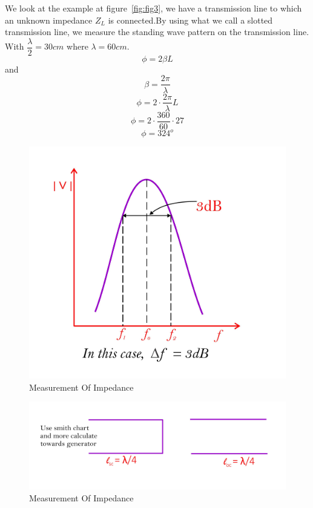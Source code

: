 \begin{example}
We look at the example at figure~\ref{fig:fig3}, we have a transmission line to which an unknown impedance $Z_L$ is connected.By using what we call a slotted transmission line, we measure the standing wave pattern on the transmission line. With $\dfrac{\lambda}{2}=30cm$ where $\lambda=60cm.$
$$\phi=2\beta L$$ 
and 
\begin{dmath*}
\beta=\dfrac{2\pi}{\lambda}
\end{dmath*}
\begin{dmath*}
\phi=2\cdot\dfrac{2\pi}{\lambda} L
\end{dmath*}
$$\phi=2\cdot\dfrac{360}{60}\cdot27$$
$$\phi=324^{o}$$
\begin{figure}[h]
\centering
\includegraphics[width=1\linewidth]{./graphics/fig2}
\caption{Measurement Of Impedance}
\end{figure}
\begin{figure}[h]
\centering
\includegraphics[width=1\linewidth]{./graphics/fig1}
\caption{Measurement Of Impedance}
\end{figure}


\end{example}
